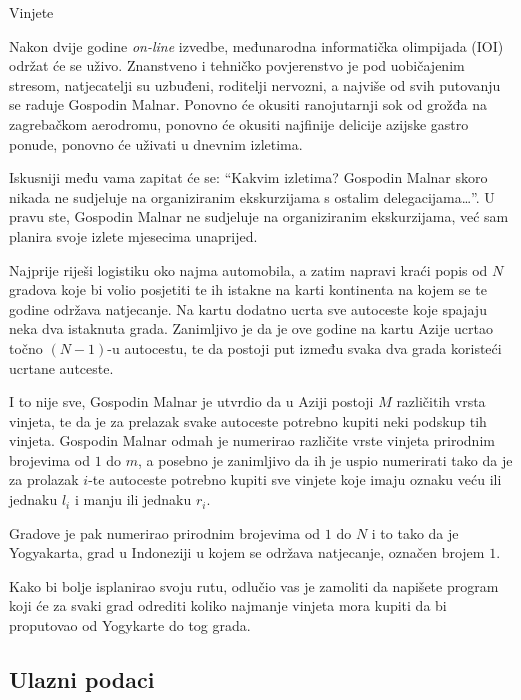 \begin{statement}[
  problempoints=100,
  timelimit=1 sekunda,
  memorylimit=512 MiB,
]{Vinjete}

Nakon dvije godine \textit{on-line} izvedbe, međunarodna informatička
olimpijada (IOI) održat će se uživo. Znanstveno i tehničko povjerenstvo je
pod uobičajenim stresom, natjecatelji su uzbuđeni, roditelji nervozni, a
najviše od svih putovanju se raduje Gospodin Malnar. Ponovno će okusiti
ranojutarnji sok od grožđa na zagrebačkom aerodromu, ponovno će okusiti
najfinije delicije azijske gastro ponude, ponovno će uživati u dnevnim
izletima.

Iskusniji među vama zapitat će se: ``Kakvim izletima? Gospodin Malnar skoro
nikada ne sudjeluje na organiziranim ekskurzijama s ostalim delegacijama\ldots''.
U pravu ste, Gospodin Malnar ne sudjeluje na organiziranim ekskurzijama, već sam
planira svoje izlete mjesecima unaprijed.

Najprije riješi logistiku oko najma automobila, a zatim napravi kraći popis od
$N$ gradova koje bi volio posjetiti te ih istakne na karti kontinenta na
kojem se te godine održava natjecanje. Na kartu dodatno ucrta sve autoceste
koje spajaju neka dva istaknuta grada. Zanimljivo je da je ove godine na
kartu Azije ucrtao točno $(N-1)$-u autocestu, te da postoji put između svaka
dva grada koristeći ucrtane autceste.

I to nije sve, Gospodin Malnar je utvrdio da u Aziji postoji $M$ različitih
vrsta vinjeta, te da je za prelazak svake autoceste potrebno kupiti neki
podskup tih vinjeta. Gospodin Malnar odmah je numerirao različite vrste
vinjeta prirodnim brojevima od $1$ do $m$, a posebno je zanimljivo da ih je
uspio numerirati tako da je za prolazak $i$-te autoceste potrebno kupiti sve
vinjete koje imaju oznaku veću ili jednaku $l_i$ i manju ili jednaku $r_i$.

Gradove je pak numerirao prirodnim brojevima od $1$ do $N$ i to tako da je
Yogyakarta, grad u Indoneziji u kojem se održava natjecanje, označen brojem $1$.

Kako bi bolje isplanirao svoju rutu, odlučio vas je zamoliti da napišete program
koji će za svaki grad odrediti koliko najmanje vinjeta mora kupiti da bi
proputovao od Yogykarte do tog grada.
\subsection*{Ulazni podaci}


\end{statement}
